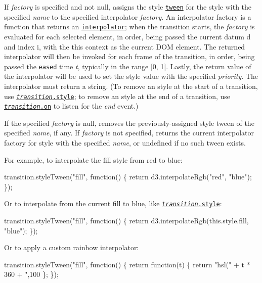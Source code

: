 If {\itshape factory} is specified and not null, assigns the style \href{#transition_tween}{\tt tween} for the style with the specified {\itshape name} to the specified interpolator {\itshape factory}. An interpolator factory is a function that returns an \href{https://github.com/d3/d3-interpolate}{\tt interpolator}; when the transition starts, the {\itshape factory} is evaluated for each selected element, in order, being passed the current datum {\ttfamily d} and index {\ttfamily i}, with the {\ttfamily this} context as the current D\+OM element. The returned interpolator will then be invoked for each frame of the transition, in order, being passed the \href{#transition_ease}{\tt eased} time {\itshape t}, typically in the range \mbox{[}0, 1\mbox{]}. Lastly, the return value of the interpolator will be used to set the style value with the specified {\itshape priority}. The interpolator must return a string. (To remove an style at the start of a transition, use \href{#transition_style}{\tt {\itshape transition}.style}; to remove an style at the end of a transition, use \href{#transition_on}{\tt {\itshape transition}.on} to listen for the {\itshape end} event.)

If the specified {\itshape factory} is null, removes the previously-\/assigned style tween of the specified {\itshape name}, if any. If {\itshape factory} is not specified, returns the current interpolator factory for style with the specified {\itshape name}, or undefined if no such tween exists.

For example, to interpolate the fill style from red to blue\+:


\begin{DoxyCode}
transition.styleTween("fill", function() \{
  return d3.interpolateRgb("red", "blue");
\});
\end{DoxyCode}


Or to interpolate from the current fill to blue, like \href{#transition_style}{\tt {\itshape transition}.style}\+:


\begin{DoxyCode}
transition.styleTween("fill", function() \{
  return d3.interpolateRgb(this.style.fill, "blue");
\});
\end{DoxyCode}


Or to apply a custom rainbow interpolator\+:


\begin{DoxyCode}
transition.styleTween("fill", function() \{
  return function(t) \{
    return "hsl(" + t * 360 + ",100%
  \};
\});
\end{DoxyCode}


